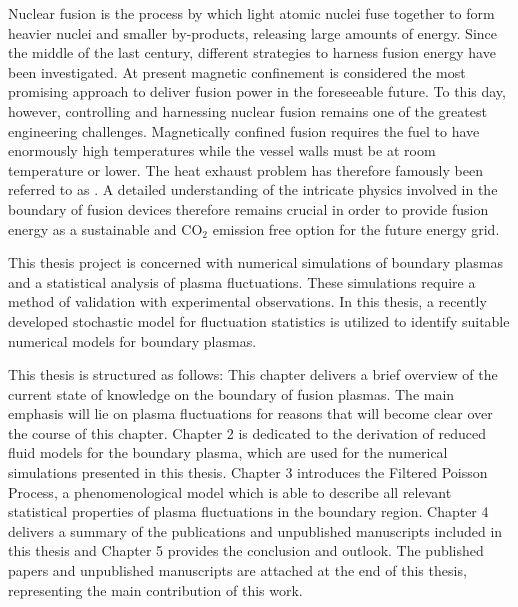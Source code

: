 Nuclear fusion is the process by which light atomic nuclei fuse
together to form heavier nuclei and smaller by-products, releasing large amounts of energy. Since the middle of the last century, different strategies to harness fusion energy have been investigated. At present magnetic confinement is considered the most promising approach to deliver fusion power in the foreseeable future. To this day, however, controlling and harnessing nuclear fusion remains one of the greatest engineering challenges. Magnetically confined fusion requires the fuel to have enormously high temperatures while the vessel walls must be at room temperature or lower. The heat exhaust problem has therefore famously been referred to as  \cite{Romanelli2012}. A detailed understanding of the intricate physics involved in the boundary of fusion devices therefore remains crucial in order to provide fusion energy as a sustainable and $\mathrm{CO_2}$ emission free option for the future energy grid.

This thesis project is concerned with numerical simulations of boundary plasmas and a statistical analysis of plasma fluctuations. These simulations require a method of validation with experimental observations. In this thesis, a recently developed stochastic model for fluctuation statistics is utilized to identify suitable numerical models for boundary plasmas.

This thesis is structured as follows: This chapter delivers a brief overview of the current state of knowledge on the boundary of fusion plasmas. The main emphasis will lie on plasma fluctuations for reasons that will become clear over the course of this chapter. Chapter 2 is dedicated to the derivation of reduced fluid models for the boundary plasma, which are used for the numerical simulations presented in this thesis. Chapter 3 introduces the Filtered Poisson Process, a phenomenological model which is able to describe all relevant statistical properties of plasma fluctuations in the boundary region. Chapter 4 delivers a summary of the publications and unpublished manuscripts included in this thesis and Chapter 5 provides the conclusion and outlook. The published papers and unpublished manuscripts are attached at the end of this thesis, representing the main contribution of this work. 


